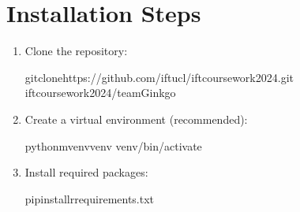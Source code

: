 \documentclass[letterpaper,10pt,english]{sphinxmanual}
\begin{document}
\section{Installation Steps}
\label{\detokenize{installation:installation-steps}}\begin{enumerate}
%
\item {} 
\sphinxAtStartPar
Clone the repository:

\begin{sphinxVerbatim}[commandchars=\\\{\}]
gitclonehttps://github.com/iftucl/ift\PYGZus{}coursework\PYGZus{}2024.git
ift\PYGZus{}coursework\PYGZus{}2024/team\PYGZus{}Ginkgo
\end{sphinxVerbatim}

\item {} 
\sphinxAtStartPar
Create a virtual environment (recommended):

\begin{sphinxVerbatim}[commandchars=\\\{\}]
python\PYGZhy{}mvenvvenv
venv/bin/activate
\end{sphinxVerbatim}

\item {} 
\sphinxAtStartPar
Install required packages:

\begin{sphinxVerbatim}[commandchars=\\\{\}]
pipinstall\PYGZhy{}rrequirements.txt
\end{sphinxVerbatim}

\end{enumerate}
\end{document}
